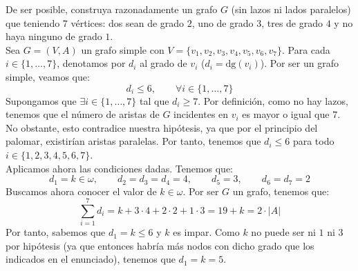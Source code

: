 \documentclass[12pt]{article}
\begin{document}
    \begin{ejercicio}
        De ser posible, construya razonadamente un grafo $G$ (sin lazos ni lados paralelos) que teniendo $7$
        vértices: dos sean de grado $2$, uno de grado $3$, tres de grado $4$ y no haya ninguno de grado $1$.\\

        Sea $G=(V,A)$ un grafo simple con $V=\{v_1,v_2,v_3,v_4,v_5,v_6,v_7\}$. Para cada $i\in\{1,\dots,7\}$, denotamos por $d_i$ al grado de $v_i$ ($d_i=\text{dg}(v_i)$).
        Por ser un grafo simple, veamos que:
        \begin{equation*}
            d_i\leq 6, \qquad \forall i\in\{1,\dots,7\}
        \end{equation*}
        Supongamos que $\exists i\in\{1,\dots,7\}$ tal que $d_i\geq 7$.
        Por definición, como no hay lazos, tenemos que el número de aristas de
        $G$ incidentes en $v_i$ es mayor o igual que $7$. No obstante, esto contradice nuestra hipótesis, ya que
        por el principio del palomar, existirían aristas paralelas.
        Por tanto, tenemos que $d_i\leq 6$ para todo $i\in \{1,2,3,4,5,6,7\}$.\\

        Aplicamos ahora las condiciones dadas. Tenemos que:
        \begin{equation*}
            d_1 = k\in \omega, \qquad d_2=d_3=d_4=4, \qquad d_5=3,\qquad d_6=d_7=2
        \end{equation*}
        Buscamos ahora conocer el valor de $k\in \omega$. Por ser $G$ un grafo, tenemos que:
        \begin{equation*}
            \sum_{i=1}^7 d_i = k+3\cdot 4+2\cdot 2+1\cdot 3 = 19+k = 2\cdot |A|
        \end{equation*}
        Por tanto, sabemos que $d_1=k\leq 6$ y $k$ es impar. Como $k$ no puede ser ni $1$ ni $3$ por hipótesis (ya que entonces habría más nodos con dicho grado que los indicados en el enunciado),
        tenemos que $d_1=k=5$.\\


\end{ejercicio}
\end{document}
